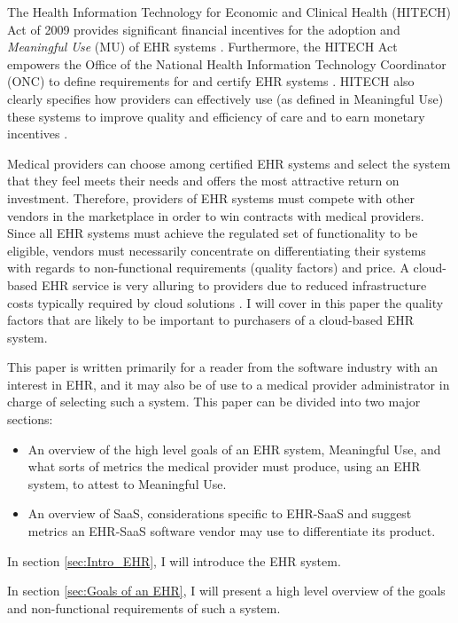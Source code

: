 \documentclass[10pt]{article}
\begin{document}
The Health Information Technology for Economic and Clinical Health (HITECH) Act of 2009 provides significant financial incentives for the adoption and \textit{Meaningful Use} (MU) of EHR systems \cite{ehrbook}.
Furthermore, the HITECH Act empowers the Office of the National Health Information Technology Coordinator (ONC) to define requirements for and certify EHR systems \cite{onc-ehr}.
HITECH also clearly specifies how providers can effectively use (as defined in Meaningful Use) these systems to improve quality and efficiency of care and to earn monetary incentives \cite{ehrbook}.

Medical providers can choose among certified EHR systems and select the system that they feel meets their needs and offers the most attractive return on investment.
Therefore, providers of EHR systems must compete with other vendors in the marketplace in order to win contracts with medical providers.
Since all EHR systems must achieve the regulated set of functionality to be eligible, vendors must necessarily concentrate on differentiating their systems with regards to non-functional requirements (quality factors) and price.
A cloud-based EHR service is very alluring to providers due to reduced infrastructure costs typically required by cloud solutions \cite{auditingprivacy}.
I will cover in this paper the quality factors that are likely to be important to purchasers of a cloud-based EHR system.

This paper is written primarily for a reader from the software industry with an interest in EHR, and it may also be of use to a medical provider administrator in charge of selecting such a system.
This paper can be divided into two major sections:
\begin{itemize}
	\item An overview of the high level goals of an EHR system, Meaningful Use, and what sorts of metrics the medical provider must produce, using an EHR system, to attest to Meaningful Use.
	\item An overview of SaaS, considerations specific to EHR-SaaS and suggest metrics an EHR-SaaS software vendor may use to differentiate its product.
\end{itemize}

In section \ref{sec:Intro_EHR}, I will introduce the EHR system.

In section \ref{sec:Goals of an EHR}, I will present a high level overview of the goals and non-functional requirements of such a system.
\end{document}

